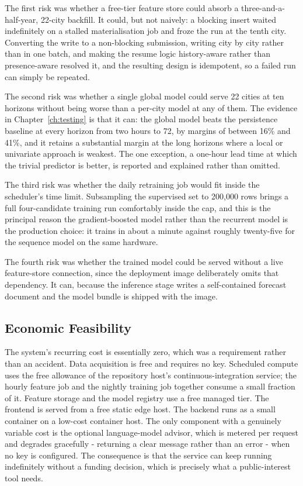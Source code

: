 The first risk was whether a free-tier feature store could absorb a
three-and-a-half-year, 22-city backfill. It could, but not naively: a blocking
insert waited indefinitely on a stalled materialisation job and froze the run at
the tenth city. Converting the write to a non-blocking submission, writing city by
city rather than in one batch, and making the resume logic history-aware rather
than presence-aware resolved it, and the resulting design is idempotent, so a
failed run can simply be repeated.

The second risk was whether a single global model could serve 22 cities at ten
horizons without being worse than a per-city model at any of them. The evidence
in Chapter~\ref{ch:testing} is that it can: the global model beats the
persistence baseline at every horizon from two hours to 72, by margins of between
16\% and 41\%, and it retains a substantial margin at the long horizons where a
local or univariate approach is weakest. The one exception, a one-hour lead time
at which the trivial predictor is better, is reported and explained rather than
omitted.

The third risk was whether the daily retraining job would fit inside the
scheduler's time limit. Subsampling the supervised set to 200,000 rows brings a
full four-candidate training run comfortably inside the cap, and this is the
principal reason the gradient-boosted model rather than the recurrent model is
the production choice: it trains in about a minute against roughly twenty-five
for the sequence model on the same hardware.

The fourth risk was whether the trained model could be served without a live
feature-store connection, since the deployment image deliberately omits that
dependency. It can, because the inference stage writes a self-contained forecast
document and the model bundle is shipped with the image.

\subsection{Economic Feasibility}
The system's recurring cost is essentially zero, which was a requirement rather
than an accident. Data acquisition is free and requires no key. Scheduled compute
uses the free allowance of the repository host's continuous-integration service;
the hourly feature job and the nightly training job together consume a small
fraction of it. Feature storage and the model registry use a free managed tier.
The frontend is served from a free static edge host. The backend runs as a small
container on a low-cost container host. The only component with a genuinely
variable cost is the optional language-model advisor, which is metered per
request and degrades gracefully - returning a clear message rather than an error
- when no key is configured. The consequence is that the service can keep
running indefinitely without a funding decision, which is precisely what a
public-interest tool needs.

